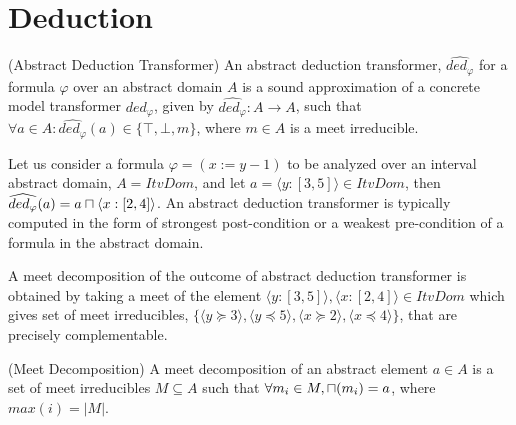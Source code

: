 \section{Deduction}
\begin{definition}{(Abstract Deduction Transformer)} An abstract deduction
transformer, $\widehat{ded_{\varphi}}$ for a formula $\varphi$ over an abstract 
domain $A$ is a sound approximation of a concrete model transformer
$ded_{\varphi}$, given by $\widehat{ded_{\varphi}} : A \rightarrow A$, such that 
$\forall a \in A: \widehat{ded_{\varphi}}(a) \in \{\top, \bot, m\}$, where 
$m \in A$ is a meet irreducible.   
\end{definition}

Let us consider a formula $\varphi = (x:=y-1)$ to be analyzed over 
an interval abstract domain, $A = ItvDom$, and let $a = \langle y:[3, 5]
\rangle \in ItvDom$, then $\widehat{ded_{\varphi}}(a) = a \sqcap \langle x:[2, 4]
\rangle$.  An abstract deduction transformer is typically computed in the form 
of strongest post-condition or a weakest pre-condition of a formula in the 
abstract domain.    

A meet decomposition of the outcome of abstract deduction transformer 
is obtained by taking a meet of the element $\langle y:[3, 5] \rangle, 
\langle x:[2, 4] \rangle \in ItvDom$ which gives set of meet irreducibles, 
$\{ \langle y \succeq 3 \rangle, \langle y \preceq 5 \rangle, 
\langle x \succeq 2 \rangle, \langle x \preceq 4 \rangle \}$, that are 
precisely complementable.

\begin{definition}{(Meet Decomposition)} A meet decomposition of an abstract
element $a \in A$ is a set of meet irreducibles $M \subseteq A$ such that 
$\forall m_i \in M, \sqcap(m_i) = a$, where $max(i) = |M|$.
\end{definition}
 

